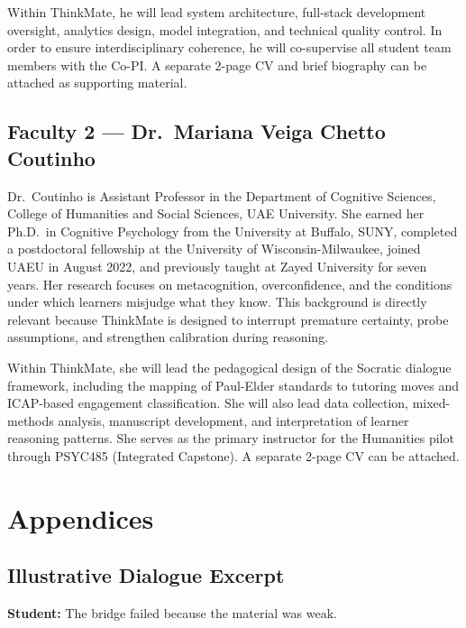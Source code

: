 \documentclass[11pt,a4paper]{article}
\begin{document}
Within ThinkMate, he will lead system architecture, full-stack development oversight, analytics design, model integration, and technical quality control. In order to ensure interdisciplinary coherence, he will co-supervise all student team members with the Co-PI. A separate 2-page CV and brief biography can be attached as supporting material.

\subsection*{Faculty 2 --- Dr.\ Mariana Veiga Chetto Coutinho}

Dr.\ Coutinho is Assistant Professor in the Department of Cognitive Sciences, College of Humanities and Social Sciences, UAE University. She earned her Ph.D.\ in Cognitive Psychology from the University at Buffalo, SUNY, completed a postdoctoral fellowship at the University of Wisconsin-Milwaukee, joined UAEU in August 2022, and previously taught at Zayed University for seven years. Her research focuses on metacognition, overconfidence, and the conditions under which learners misjudge what they know. This background is directly relevant because ThinkMate is designed to interrupt premature certainty, probe assumptions, and strengthen calibration during reasoning.

Within ThinkMate, she will lead the pedagogical design of the Socratic dialogue framework, including the mapping of Paul-Elder standards to tutoring moves and ICAP-based engagement classification. She will also lead data collection, mixed-methods analysis, manuscript development, and interpretation of learner reasoning patterns. She serves as the primary instructor for the Humanities pilot through PSYC485 (Integrated Capstone). A separate 2-page CV can be attached.

\section{Appendices}

\subsection*{Illustrative Dialogue Excerpt}

\noindent\textbf{Student:} The bridge failed because the material was weak.
\end{document}
